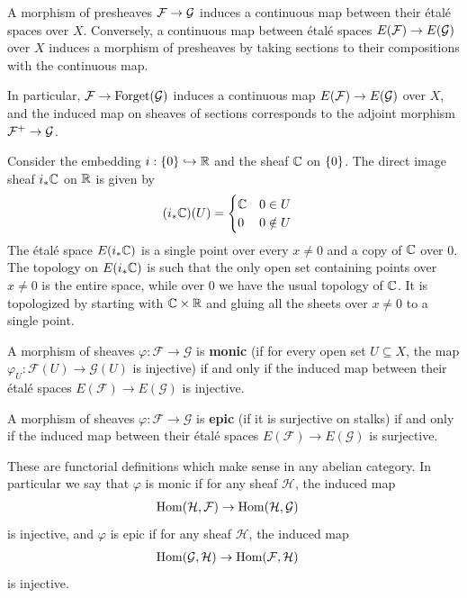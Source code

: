 \documentclass[12pt]{article}
\begin{document}
\begin{proposition}
    A morphism of presheaves ${\mathcal{F}} \to {\mathcal{G}}$ induces a continuous map between their étalé spaces over $X$. Conversely, a continuous map between étalé spaces $E({\mathcal{F}}) \to E({\mathcal{G}})$ over $X$ induces a morphism of presheaves by taking sections to their compositions with the continuous map.

    In particular, $\mathcal{F} \to \operatorname{Forget}({\mathcal{G}})$ induces a continuous map $E(\mathcal{F}) \to E({\mathcal{G}})$ over $X$, and the induced map on sheaves of sections corresponds to the adjoint morphism $\mathcal{F}^+ \to {\mathcal{G}}$.
\end{proposition}

\begin{example}
    Consider the embedding $i:\{0\} \hookrightarrow \mathbb{R}$ and the sheaf $\mathbb{C}$ on $\{0\}$. The direct image sheaf $i_* \mathbb{C}$ on $\mathbb{R}$ is given by \begin{align*}
        (i_* \mathbb{C})(U) & = \begin{cases}
            \mathbb{C} & 0 \in U \\
            0 & 0 \notin U
        \end{cases}
    \end{align*} The étalé space $E(i_* \mathbb{C})$ is a single point over every $x \neq 0$ and a copy of $\mathbb{C}$ over $0$. The topology on $E(i_* \mathbb{C})$ is such that the only open set containing points over $x \neq 0$ is the entire space, while over $0$ we have the usual topology of $\mathbb{C}$. It is topologized by starting with $\mathbb{C}\times \mathbb{R}$ and gluing all the sheets over $x \neq 0$ to a single point.
\end{example}

\begin{definition}
    A morphism of sheaves $\varphi: \mathcal{F} \to \mathcal{G}$ is \textbf{monic} (if for every open set $U \subseteq X$, the map $\varphi_U: \mathcal{F}(U) \to \mathcal{G}(U)$ is injective) if and only if the induced map between their étalé spaces $E(\mathcal{F}) \to E(\mathcal{G})$ is injective.

    A morphism of sheaves $\varphi: \mathcal{F} \to \mathcal{G}$ is \textbf{epic} (if it is surjective on stalks) if and only if the induced map between their étalé spaces $E(\mathcal{F}) \to E(\mathcal{G})$ is surjective.
\end{definition}

\begin{remark}
    These are functorial definitions which make sense in any abelian category. In particular we say that $\varphi$ is monic if for any sheaf $\mathcal{H}$, the induced map \begin{align*}
        \operatorname{Hom}(\mathcal{H}, \mathcal{F}) & \to \operatorname{Hom}(\mathcal{H}, \mathcal{G})
    \end{align*} is injective, and $\varphi$ is epic if for any sheaf $\mathcal{H}$, the induced map \begin{align*}
        \operatorname{Hom}(\mathcal{G}, \mathcal{H}) & \to \operatorname{Hom}(\mathcal{F}, \mathcal{H})
    \end{align*} is injective.
\end{remark}
\end{document}
